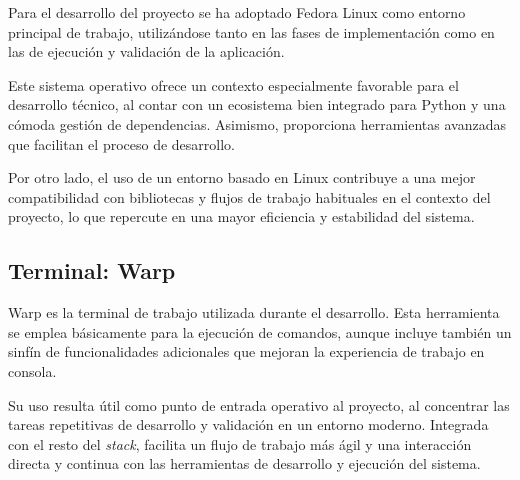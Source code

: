 Para el desarrollo del proyecto se ha adoptado Fedora Linux \cite{fedora} como entorno principal de trabajo, 
utilizándose tanto en las fases de implementación como en las de ejecución y validación de la aplicación.

Este sistema operativo ofrece un contexto especialmente favorable para el desarrollo técnico, al contar con 
un ecosistema bien integrado para Python y una cómoda gestión de dependencias. Asimismo, proporciona herramientas 
avanzadas que facilitan el proceso de desarrollo.

Por otro lado, el uso de un entorno basado en Linux contribuye a una mejor compatibilidad con bibliotecas y flujos 
de trabajo habituales en el contexto del proyecto, lo que repercute 
en una mayor eficiencia y estabilidad del sistema.

\subsection{Terminal: Warp}

Warp \cite{warp} es la terminal de trabajo utilizada durante el desarrollo. 
Esta herramienta se emplea básicamente para la ejecución de comandos, 
aunque incluye también un sinfín de funcionalidades adicionales que mejoran la 
experiencia de trabajo en consola.

Su uso resulta útil como punto de entrada operativo al proyecto, al concentrar
las tareas repetitivas de desarrollo y validación en un entorno moderno. 
Integrada con el resto del \textit{stack}, facilita un flujo de trabajo más ágil y 
una interacción directa y continua con las herramientas de desarrollo y ejecución del sistema.
